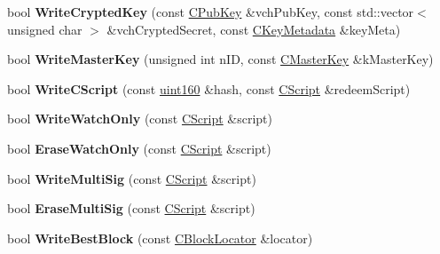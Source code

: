 \begin{DoxyCompactItemize}
\mbox{\label{class_c_wallet_d_b_a914fb53d1731daf9b486f164dd325210}} 
bool {\bfseries Write\+Crypted\+Key} (const \mbox{\hyperlink{class_c_pub_key}{C\+Pub\+Key}} \&vch\+Pub\+Key, const std\+::vector$<$ unsigned char $>$ \&vch\+Crypted\+Secret, const \mbox{\hyperlink{class_c_key_metadata}{C\+Key\+Metadata}} \&key\+Meta)
\item 
\mbox{\label{class_c_wallet_d_b_a507690da431ef61244941ad39c308aeb}} 
bool {\bfseries Write\+Master\+Key} (unsigned int n\+ID, const \mbox{\hyperlink{class_c_master_key}{C\+Master\+Key}} \&k\+Master\+Key)
\item 
\mbox{\label{class_c_wallet_d_b_a8c69e48e2305775898658e0a4f4616c9}} 
bool {\bfseries Write\+C\+Script} (const \mbox{\hyperlink{classuint160}{uint160}} \&hash, const \mbox{\hyperlink{class_c_script}{C\+Script}} \&redeem\+Script)
\item 
\mbox{\label{class_c_wallet_d_b_a05e5a277f66010d12071a5d72cb4dfb0}} 
bool {\bfseries Write\+Watch\+Only} (const \mbox{\hyperlink{class_c_script}{C\+Script}} \&script)
\item 
\mbox{\label{class_c_wallet_d_b_ad6e63f550853905fcd67ec9e7c3bef8b}} 
bool {\bfseries Erase\+Watch\+Only} (const \mbox{\hyperlink{class_c_script}{C\+Script}} \&script)
\item 
\mbox{\label{class_c_wallet_d_b_a31a2e462a1a650c00216832db7c432ef}} 
bool {\bfseries Write\+Multi\+Sig} (const \mbox{\hyperlink{class_c_script}{C\+Script}} \&script)
\item 
\mbox{\label{class_c_wallet_d_b_a87baf4ce6ec8829649618706ba00b267}} 
bool {\bfseries Erase\+Multi\+Sig} (const \mbox{\hyperlink{class_c_script}{C\+Script}} \&script)
\item 
\mbox{\label{class_c_wallet_d_b_a5660d366fee16ab81f3e7d3a97892486}} 
bool {\bfseries Write\+Best\+Block} (const \mbox{\hyperlink{struct_c_block_locator}{C\+Block\+Locator}} \&locator)
\item 
\mbox{\label{class_c_wallet_d_b_a20eecdac6605607ff7cba2f55ec86f73}} 

\end{DoxyCompactItemize}
